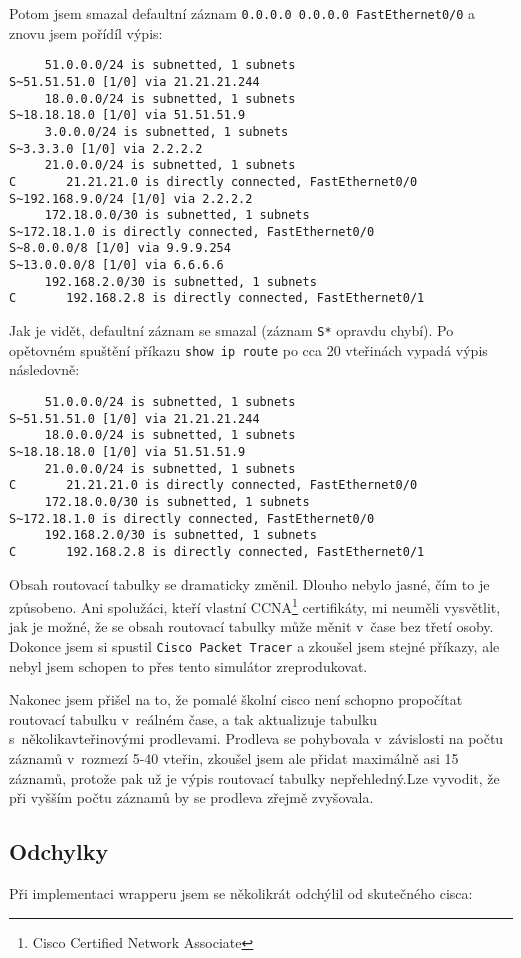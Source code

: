 Potom jsem smazal defaultní záznam \verb|0.0.0.0 0.0.0.0 FastEthernet0/0| a znovu jsem pořídíl výpis:
\begin{verbatim}
     51.0.0.0/24 is subnetted, 1 subnets
S~51.51.51.0 [1/0] via 21.21.21.244
     18.0.0.0/24 is subnetted, 1 subnets
S~18.18.18.0 [1/0] via 51.51.51.9
     3.0.0.0/24 is subnetted, 1 subnets
S~3.3.3.0 [1/0] via 2.2.2.2
     21.0.0.0/24 is subnetted, 1 subnets
C       21.21.21.0 is directly connected, FastEthernet0/0
S~192.168.9.0/24 [1/0] via 2.2.2.2
     172.18.0.0/30 is subnetted, 1 subnets
S~172.18.1.0 is directly connected, FastEthernet0/0
S~8.0.0.0/8 [1/0] via 9.9.9.254
S~13.0.0.0/8 [1/0] via 6.6.6.6
     192.168.2.0/30 is subnetted, 1 subnets
C       192.168.2.8 is directly connected, FastEthernet0/1
\end{verbatim} 
Jak je vidět, defaultní záznam se smazal (záznam \verb|S*| opravdu chybí). Po opětovném spuštění příkazu \verb|show ip route| po cca 20 vteřinách vypadá výpis následovně:
\begin{verbatim}
     51.0.0.0/24 is subnetted, 1 subnets
S~51.51.51.0 [1/0] via 21.21.21.244
     18.0.0.0/24 is subnetted, 1 subnets
S~18.18.18.0 [1/0] via 51.51.51.9
     21.0.0.0/24 is subnetted, 1 subnets
C       21.21.21.0 is directly connected, FastEthernet0/0
     172.18.0.0/30 is subnetted, 1 subnets
S~172.18.1.0 is directly connected, FastEthernet0/0
     192.168.2.0/30 is subnetted, 1 subnets
C       192.168.2.8 is directly connected, FastEthernet0/1
\end{verbatim} 

Obsah routovací tabulky se dramaticky změnil. Dlouho nebylo jasné, čím to je způsobeno. Ani spolužáci, kteří vlastní CCNA\footnote{Cisco Certified Network Associate} certifikáty, mi neuměli vysvětlit, jak je možné, že se obsah routovací tabulky může měnit v~čase bez třetí osoby. Dokonce jsem si spustil \verb|Cisco Packet Tracer| a zkoušel jsem stejné příkazy, ale nebyl jsem schopen to přes tento simulátor zreprodukovat.

Nakonec jsem přišel na to, že pomalé školní cisco není schopno propočítat routovací tabulku v~reálném čase, a tak aktualizuje tabulku s~několikavteřinovými prodlevami. Prodleva se pohybovala v~závislosti na počtu záznamů v~rozmezí 5-40 vteřin, zkoušel jsem ale přidat maximálně asi 15 záznamů, protože pak už je výpis routovací tabulky nepřehledný.Lze vyvodit, že při vyšším počtu záznamů by se prodleva zřejmě zvyšovala. 

\subsection{Odchylky}
Při implementaci wrapperu jsem se několikrát odchýlil od skutečného cisca:

